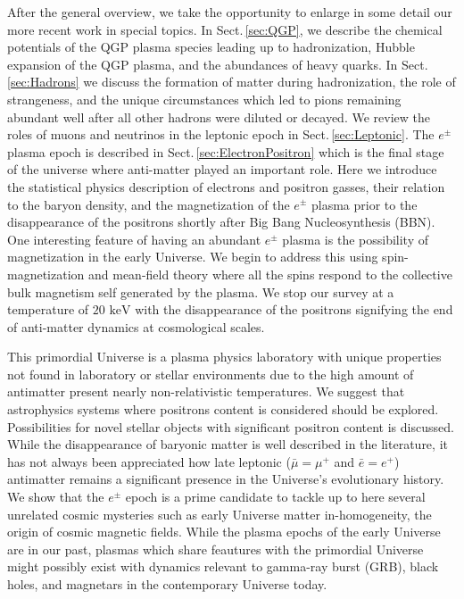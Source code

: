 \documentclass[universe,article,submit,moreauthors,pdftex,a4paper]{Definitions/mdpi}
\newcommand{\keV}{\text{ keV}}
\newcommand*{\rsec}[1]{Sect.\,{\ref{#1}}}
\begin{document}
After the general overview, we take the opportunity to enlarge in some detail our more recent work in special topics. In \rsec{sec:QGP}, we describe the chemical potentials of the QGP plasma species leading up to hadronization, Hubble expansion of the QGP plasma, and the abundances of heavy quarks. In \rsec{sec:Hadrons} we discuss the formation of matter during hadronization, the role of strangeness, and the unique circumstances which led to pions remaining abundant well after all other hadrons were diluted or decayed. We review the roles of muons and neutrinos in the leptonic epoch in \rsec{sec:Leptonic}. The $e^{\pm}$ plasma epoch is described in \rsec{sec:ElectronPositron} which is the final stage of the universe where anti-matter played an important role. Here we introduce the statistical physics description of electrons and positron gasses, their relation to the baryon density, and the magnetization of the $e^{\pm}$ plasma prior to the disappearance of the positrons shortly after Big Bang Nucleosynthesis (BBN). One interesting feature of having an abundant $e^{\pm}$ plasma is the possibility of magnetization in the early Universe. We begin to address this using spin-magnetization and mean-field theory where all the spins respond to the collective bulk magnetism self generated by the plasma. We stop our survey at a temperature of $20\keV$ with the disappearance of the positrons signifying the end of anti-matter dynamics at cosmological scales.

This primordial Universe is a plasma physics laboratory with unique properties not found in laboratory or stellar environments due to the high amount of antimatter present nearly non-relativistic temperatures. We suggest that astrophysics systems where positrons content is considered should be explored. Possibilities for novel stellar objects with significant positron content is discussed. While the disappearance of baryonic matter is well described in the literature, it has not always been appreciated how late leptonic ($\bar{\mu}=\mu^{+}$ and $\bar{e}=e^{+}$) antimatter remains a significant presence in the Universe's evolutionary history. We show that the $e^{\pm}$ epoch is a prime candidate to tackle up to here several unrelated cosmic mysteries such as early Universe matter in-homogeneity, the origin of cosmic magnetic fields. While the plasma epochs of the early Universe are in our past, plasmas which share feautures with the primordial Universe might possibly exist with dynamics relevant to gamma-ray burst (GRB), black holes, \cite{Ruffini:2009hg,Ruffini:2012it,Han:2011er,Ruffini:2000yu} and magnetars in the contemporary Universe today. 
\end{document}

